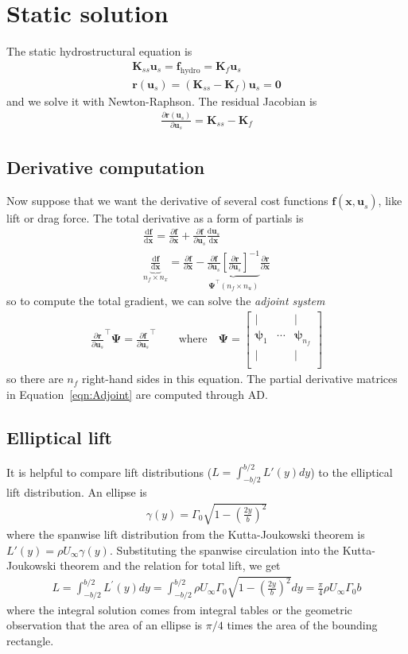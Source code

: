 \documentclass[10pt]{article}
\newcommand{\pp}[2]{\frac{\partial #1}{\partial #2}}
\newcommand{\dd}[2]{\frac{\textrm{d} #1}{\textrm{d} #2}}
\newcommand{\mbf}[1]{\mathbf{#1}}
\newcommand{\be}{\begin{eqnarray}}
\newcommand{\ee}{\end{eqnarray}}
\newcommand{\Uinf}{U_{\infty}}
\newcommand{\tn}[1]{\textrm{#1}}
\begin{document}
\onecolumn
\clearpage
\section{Static solution}
The static hydrostructural equation is
\be
\mbf{K}_{ss} \mbf{u}_s   = \mbf{f}_{\tn{hydro}} = \mbf{K}_f \mbf{u}_s
\\
\mbf{r}(\mbf{u}_s) = \left(\mbf{K}_{ss} - \mbf{K}_f\right)\mbf{u}_s  = \mbf{0}
\ee
and we solve it with Newton-Raphson.
The residual Jacobian is
\be
\pp{\mbf{r}(\mbf{u}_s)}{\mbf{u}_s}
=
\mbf{K}_{ss} - \mbf{K}_{f}
\ee

\subsection{Derivative computation}
% 
Now suppose that we want the derivative of several cost functions $\mbf{f}(\mbf{x,u}_s)$, like lift or drag force.
The total derivative as a form of partials \cite[Sec. 6.7.2]{Martins2022} is
\be
\dd{\mbf{f}}{\mbf{x}} =
\pp{\mbf{f}}{\mbf{x}} + \pp{\mbf{f}}{\mbf{u}_s} \dd{\mbf{u}_s}{\mbf{x}}
\\
\label{eqn:Adjoint}
\boxed{
    \underbrace{
        \dd{ \mbf{f}}{\mbf{x}}
    }_{n_f \times n_x}
    = \pp{\mbf{f}}{\mbf{x}}
    -
    \underbrace{\pp{\mbf{f}}{\mbf{u}_s} \left[\pp{\mbf{r}}{\mbf{u}_s}\right]^{-1}
    }_{\boldsymbol{\Psi^\top} (n_f \times n_u)}
    \pp{\mbf{r}}{\mbf{x}}
}
\ee
so to compute the total gradient, we can solve the \emph{adjoint system}
\be
\pp{\mbf{r}}{\mbf{u}_s}^\top \boldsymbol{\Psi}
=
\pp{\mbf{f}}{\mbf{u}_s}^\top
\qquad
\tn{where}
\quad
\boldsymbol{\Psi} = \begin{bmatrix}
    |                   &        & |                       \\
    \boldsymbol{\psi}_1 & \cdots & \boldsymbol{\psi}_{n_f} \\
    |                   &        & |                       \\
\end{bmatrix}
\ee
so there are $n_f$ right-hand sides in this equation.
The partial derivative matrices in Equation~\eqref{eqn:Adjoint} are computed through \ac{AD}.
\subsection{Elliptical lift}
It is helpful to compare lift distributions ($L = \int_{-b/2}^{b/2}L'(y) dy$) to the elliptical lift distribution.
An ellipse is
\be
\gamma(y)=\Gamma_0 \sqrt{1-\left(\frac{2 y}{b}\right)^2}
\ee
where the spanwise lift distribution from the Kutta-Joukowski theorem is $L'(y) = \rho \Uinf \gamma(y)$.
Substituting the spanwise circulation into the Kutta-Joukowski theorem and the relation for total lift, we get
\be
L=\int_{-b / 2}^{b / 2} L^{\prime}(y) d y=\int_{-b / 2}^{b / 2} \rho \Uinf \Gamma_0 \sqrt{1-\left(\frac{2 y}{b}\right)^2} d y=\frac{\pi}{4} \rho \Uinf \Gamma_0 b
\ee
where the integral solution comes from integral tables or the geometric observation that the area of an ellipse is $\pi/4$ times the area of the bounding rectangle.
\end{document}
